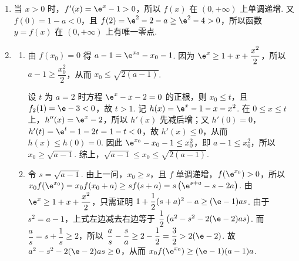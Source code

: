 \begin{solution}
\begin{enumerate}
\item 当 \(x>0\) 时，\(f'(x)=\e^x-1>0\)，所以 \(f(x)\) 在 \((0,+\infty)\) 上单调递增. 又 \(f(0)=1-a<0\)，且 \(f(2)=\e^2-2-a\ge\e^2-4>0\)，所以函数 \(y=f(x)\) 在 \((0,+\infty)\) 上有唯一零点.

\item
\begin{enumerate}
\item 由 \(f(x_0)=0\) 得 \(a-1=\e^{x_0}-x_0-1\). 因为 \(\e^x\ge1+x+\dfrac{x^2}{2}\)，所以 \(a-1\ge\dfrac{x_0^2}{2}\)，从而 \(x_0\le\sqrt{2(a-1)}\).

设 \(t\) 为 \(a=2\) 时方程 \(\e^x-x-2=0\) 的正根，则 \(x_0\le t\)，且 \(f_2(1)=\e-3<0\)，故 \(t>1\). 记 \(h(x)=\e^x-1-x-x^2\). 在 \(0\le x\le t\) 上，\(h''(x)=\e^x-2\)，所以 \(h'(x)\) 先减后增；又 \(h'(0)=0\)，\(h'(t)=\e^t-1-2t=1-t<0\)，故 \(h'(x)\le0\)，从而 \(h(x)\le h(0)=0\). 因此 \(\e^{x_0}-x_0-1\le x_0^2\)，即 \(a-1\le x_0^2\)，所以 \(x_0\ge\sqrt{a-1}\). 综上，\(\sqrt{a-1}\le x_0\le\sqrt{2(a-1)}\).

\item 令 \(s=\sqrt{a-1}\). 由上一问，\(x_0\ge s\)，且 \(f\) 单调递增，\(f(\e^{x_0})>0\)，所以
\(x_0f(\e^{x_0})=x_0f(x_0+a)\ge s f(s+a)=s\left(\e^{s+a}-s-2a\right)\).
由 \(\e^x\ge1+x+\dfrac{x^2}{2}\)，只需证明
\(1+\dfrac12(s+a)^2-a\ge(\e-1)as\).
由于 \(s^2=a-1\)，上式左边减去右边等于
\(\dfrac12\left(a^2-s^2-2(\e-2)as\right)\).
而
\(\dfrac{a}{s}=s+\dfrac1s\ge2\)，所以
\(\dfrac{a}{s}-\dfrac{s}{a}\ge2-\dfrac12=\dfrac32>2(\e-2)\).
故 \(a^2-s^2-2(\e-2)as\ge0\)，从而
\(x_0f(\e^{x_0})\ge(\e-1)(a-1)a\).
\end{enumerate}
\end{enumerate}
\end{solution}
